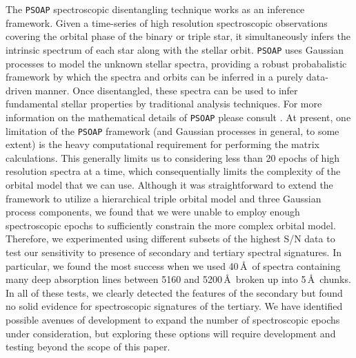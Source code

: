 \documentclass[twocolumn]{aastex61}
\begin{document}
The \texttt{PSOAP} spectroscopic disentangling technique works as an inference framework. Given a time-series of high resolution spectroscopic observations covering the orbital phase of the binary or triple star, it simultaneously infers the intrinsic spectrum of each star along with the stellar orbit. \texttt{PSOAP} uses Gaussian processes to model the unknown stellar spectra, providing a robust probabalistic framework by which the spectra and orbits can be inferred in a purely data-driven manner. Once disentangled, these spectra can be used to infer fundamental stellar properties by traditional analysis techniques. For more information on the mathematical details of \texttt{PSOAP} please consult \citet{czekala17}. At present, one limitation of the \texttt{PSOAP} framework (and Gaussian processes in general, to some extent) is the heavy computational requirement for performing the matrix calculations. This generally limits us to considering less than 20 epochs of high resolution spectra at a time, which consequentially limits the complexity of the orbital model that we can use. Although it was straightforward to extend the framework to utilize a hierarchical triple orbital model and three Gaussian process components, we found that we were unable to employ enough spectroscopic epochs to sufficiently constrain the more complex orbital model. Therefore, we experimented using different subsets of the highest S/N data to test our sensitivity to presence of secondary and tertiary spectral signatures. In particular, we found the most success when we used 40\,\AA\ of spectra containing many deep absorption lines between 5160 and 5200\,\AA\ broken up into 5\,\AA\ chunks. In all of these tests, we clearly detected the features of the secondary but found no solid evidence for spectroscopic signatures of the tertiary. We have identified possible avenues of development to expand the number of spectroscopic epochs under consideration, but exploring these options will require development and testing beyond the scope of this paper.
\end{document}
